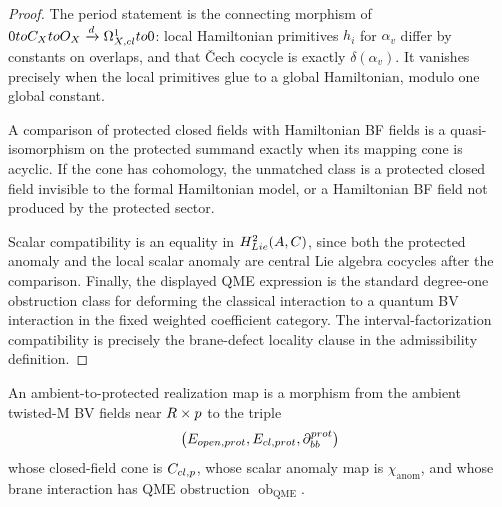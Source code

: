 \begin{proof}
  The period statement is the connecting morphism of
  \(0toC_XtoO_X\xrightarrow d\Omega^1_{X,cl}to0\):
  local Hamiltonian primitives \(h_i\) for \(\alpha_v\) differ by
  constants on overlaps, and that \v{C}ech cocycle is exactly
  \(\delta(\alpha_v)\).  It vanishes precisely when the local primitives
  glue to a global Hamiltonian, modulo one global constant.

  A comparison of protected closed fields with Hamiltonian BF fields is a
  quasi-isomorphism on the protected summand exactly when its mapping cone
  is acyclic.  If the cone has cohomology, the unmatched class is a
  protected closed field invisible to the formal Hamiltonian model, or a
  Hamiltonian BF field not produced by the protected sector.

  Scalar compatibility is an equality in
  \(H^2_{Lie}(A,C)\), since both the protected anomaly and
  the local scalar anomaly are central Lie algebra cocycles after the
  comparison.  Finally, the displayed QME expression is the standard
  degree-one obstruction class for deforming the classical interaction to
  a quantum BV interaction in the fixed weighted coefficient category.
  The interval-factorization compatibility is precisely the
  brane-defect locality clause in the admissibility definition.
\end{proof}

\begin{defn}\label{defn:ambient-protected-realization-map}
  An ambient-to-protected realization map is a morphism from the ambient
  twisted-M BV fields near \(R\times p\) to the triple
  \[
    \bigl(
      E_{open,prot},
      E_{cl,prot},
      \partial_{bb}^{prot}
    \bigr)
  \]
  whose closed-field cone is \(C_{cl,p}\), whose scalar
  anomaly map is \(\chi_{\mathrm{anom}}\), and whose brane interaction
  has QME obstruction \(\operatorname{ob}_{\mathrm{QME}}\).
\end{defn}

